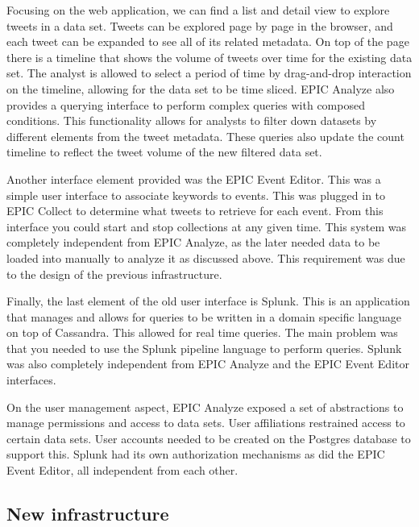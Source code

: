 Focusing on the web application, we can find a list and detail view to explore tweets in a data set. Tweets can be explored page by page in the browser, and each tweet can be expanded to see all of its related metadata. On top of the page there is a timeline that shows the volume of tweets over time for the existing data set. The analyst is allowed to select a period of time by drag-and-drop interaction on the timeline, allowing for the data set to be time sliced. EPIC Analyze also provides a querying interface to perform complex queries with composed conditions. This functionality allows for analysts to filter down datasets by different elements from the tweet metadata. These queries also update the count timeline to reflect the tweet volume of the new filtered data set.

Another interface element provided was the EPIC Event Editor. This was a simple user interface to associate keywords to events. This was plugged in to EPIC Collect to determine what tweets to retrieve for each event. From this interface you could start and stop collections at any given time. This system was completely independent from EPIC Analyze, as the later needed data to be loaded into manually to analyze it as discussed above. This requirement was due to the design of the previous infrastructure. 

Finally, the last element of the old user interface is Splunk. This is an application that manages and allows for queries to be written in a domain specific language on top of Cassandra. This allowed for real time queries. The main problem was that you needed to use the Splunk pipeline language to perform queries. Splunk was also completely independent from EPIC Analyze and the EPIC Event Editor interfaces.

On the user management aspect, EPIC Analyze exposed a set of abstractions to manage permissions and access to data sets. User affiliations restrained access to certain data sets. User accounts needed to be created on the Postgres database to support this. Splunk had its own authorization mechanisms as did the EPIC Event Editor, all independent from each other. 

\subsection{New infrastructure}

